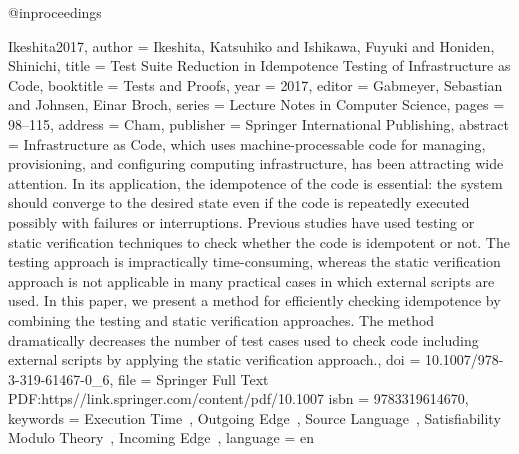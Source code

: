 {{@inproceedings{Ikeshita2017,
  author    = {Ikeshita, Katsuhiko and Ishikawa, Fuyuki and Honiden, Shinichi},
  title     = {Test {Suite} {Reduction} in {Idempotence} {Testing} of {Infrastructure} as {Code}},
  booktitle = {Tests and {Proofs}},
  year      = {2017},
  editor    = {Gabmeyer, Sebastian and Johnsen, Einar Broch},
  series    = {Lecture {Notes} in {Computer} {Science}},
  pages     = {98--115},
  address   = {Cham},
  publisher = {Springer International Publishing},
  abstract  = {Infrastructure as Code, which uses machine-processable code for managing, provisioning, and configuring computing infrastructure, has been attracting wide attention. In its application, the idempotence of the code is essential: the system should converge to the desired state even if the code is repeatedly executed possibly with failures or interruptions. Previous studies have used testing or static verification techniques to check whether the code is idempotent or not. The testing approach is impractically time-consuming, whereas the static verification approach is not applicable in many practical cases in which external scripts are used. In this paper, we present a method for efficiently checking idempotence by combining the testing and static verification approaches. The method dramatically decreases the number of test cases used to check code including external scripts by applying the static verification approach.},
  doi       = {10.1007/978-3-319-61467-0_6},
  file      = {Springer Full Text PDF:https\://link.springer.com/content/pdf/10.1007%
  isbn      = {9783319614670},
  keywords  = {Execution Time , Outgoing Edge , Source Language , Satisfiability Modulo Theory , Incoming Edge },
  language  = {en}
}

}}}
